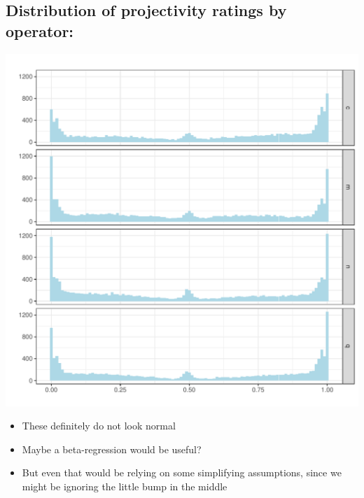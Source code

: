 \documentclass[10pt]{article}\usepackage[]{graphicx}\usepackage[]{color}
\newenvironment{knitrout}{}{} %
\begin{document}
\subsection{Distribution of projectivity ratings by operator:}
\begin{knitrout}
\color{fgcolor}

{\centering \includegraphics[width=\linewidth]{figures/figuresproject-by-op-distr-1} 

}


\end{knitrout}

\begin{itemize}
  \item These definitely do not look normal
  \item Maybe a beta-regression would be useful?
  \item But even that would be relying on some simplifying assumptions, since we might be ignoring the little bump in the middle 
\end{itemize}

\newpage
\end{document}
